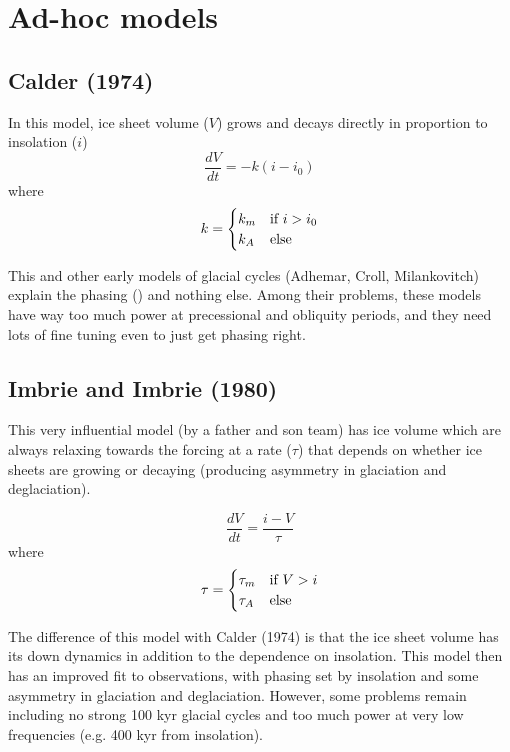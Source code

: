 \documentclass[12pt]{article}
\theoremstyle{definition}
\begin{document}
\section{Ad-hoc models}

\subsection{Calder (1974)}
\begin{shaded}
In this model, ice sheet volume ($V$) grows and decays directly in proportion to insolation ($i$)
\begin{equation}
\frac{dV}{dt} = -k (i-i_0)
\end{equation}
where 
\begin{align*}
k = \begin{cases} k_m & \hbox{if $i>i_0$} \\ k_A & \hbox{else} \end{cases}
\end{align*}
\end{shaded}
This and other early models of glacial cycles (Adhemar, Croll, Milankovitch) explain the phasing () and nothing else. Among their problems, these models have way too much power at precessional and obliquity periods, and they need lots of fine tuning even to just get phasing right.

\subsection{Imbrie and Imbrie (1980)}
This very influential model (by a father and son team) has ice volume which are always relaxing towards the forcing at a rate ($\tau$) that depends on whether ice sheets are growing or decaying (producing asymmetry in glaciation and deglaciation).
\begin{shaded}
\begin{equation}
\frac{dV}{dt} = \frac{i-V}{\tau}
\end{equation}
where 
\begin{align*}
\tau = \begin{cases} \tau_m & \hbox{if $V>i$} \\ \tau_A & \hbox{else} \end{cases}
\end{align*}
\end{shaded}
The difference of this model with Calder (1974) is that the ice sheet volume has its down dynamics in addition to the dependence on insolation. This model then has an improved fit to observations, with phasing set by insolation and some asymmetry in glaciation and deglaciation. However, some problems remain including no strong 100 kyr glacial cycles and too much power at very low frequencies (e.g. 400 kyr from insolation).
\end{document}
